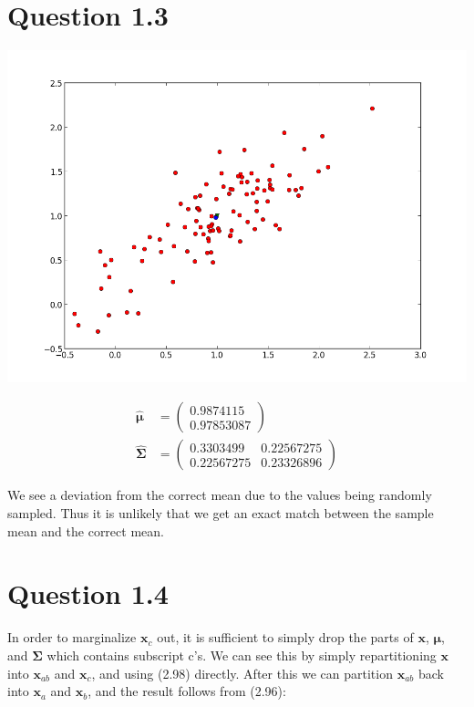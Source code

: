 \documentclass[11pt,a4paper]{article}
\newcommand{\mbf}[1]{\bm{#1}}
\begin{document}
\section{Question 1.3}
\includegraphics[width=1.1\textwidth]{figure_2.png}

\begin{align}
    \hat{\mbf{\mu}} &= \begin{pmatrix} 0.9874115 \\ 0.97853087 \end{pmatrix} \\
 \hat{\mbf{\Sigma}} &= \begin{pmatrix} 0.3303499 & 0.22567275 \\ 0.22567275 & 0.23326896 \end{pmatrix}
\end{align}

We see a deviation from the correct mean due to the values being randomly sampled. Thus it
is unlikely that we get an exact match between the sample mean and the correct mean.

\section{Question 1.4}
In order to marginalize $\mbf{x}_c$ out, it is sufficient to simply drop the parts of
$\mbf{x}$, $\mbf{\mu}$, and $\mbf{\Sigma}$ which contains subscript c's. We can see
this by simply repartitioning $\mbf{x}$ into $\mbf{x}_{ab}$ and $\mbf{x}_c$, and using
(2.98) directly. After this we can partition $\mbf{x}_{ab}$ back into $\mbf{x}_a$ and
$\mbf{x}_b$, and the result follows from (2.96):
\end{document}
